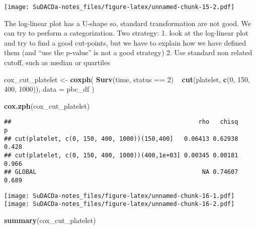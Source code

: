 \documentclass[]{book}
\newenvironment{Shaded}{\begin{snugshade}}{\end{snugshade}}
\newcommand{\KeywordTok}[1]{\textcolor[rgb]{0.13,0.29,0.53}{\textbf{{#1}}}}
\newcommand{\DataTypeTok}[1]{\textcolor[rgb]{0.13,0.29,0.53}{{#1}}}
\newcommand{\DecValTok}[1]{\textcolor[rgb]{0.00,0.00,0.81}{{#1}}}
\newcommand{\StringTok}[1]{\textcolor[rgb]{0.31,0.60,0.02}{{#1}}}
\newcommand{\NormalTok}[1]{{#1}}
\theoremstyle{definition}
\theoremstyle{definition}
\theoremstyle{definition}
\theoremstyle{remark}
\begin{document}
\texttt{[image: SuDACDa-notes\_files/figure-latex/unnamed-chunk-15-2.pdf]}

The log-linear plot has a U-shape so, standard transformation are not
good. We can try to perform a categorization. Two strategy: 1. look at
the log-linear plot and try to find a good cut-points, but we have to
explain how we have defined them (and ``use the p-value'' is not a good
strategy) 2. Use standard non related cutoff, such as median or
quartiles

\begin{Shaded}
\begin{Highlighting}[]
\NormalTok{cox_cut_platelet <-}\StringTok{ }\KeywordTok{coxph}\NormalTok{(}
  \KeywordTok{Surv}\NormalTok{(time, status ==}\StringTok{ }\DecValTok{2}\NormalTok{) ~}\StringTok{ }\KeywordTok{cut}\NormalTok{(platelet, }\KeywordTok{c}\NormalTok{(}\DecValTok{0}\NormalTok{, }\DecValTok{150}\NormalTok{, }\DecValTok{400}\NormalTok{, }\DecValTok{1000}\NormalTok{)),}
  \DataTypeTok{data =} \NormalTok{pbc_df}
\NormalTok{)}

\KeywordTok{cox.zph}\NormalTok{(cox_cut_platelet)}
\end{Highlighting}
\end{Shaded}

\begin{verbatim}
##                                                    rho   chisq     p
## cut(platelet, c(0, 150, 400, 1000))(150,400]   0.06413 0.62938 0.428
## cut(platelet, c(0, 150, 400, 1000))(400,1e+03] 0.00345 0.00181 0.966
## GLOBAL                                              NA 0.74607 0.689
\end{verbatim}

\begin{Shaded}
\end{Shaded}

\texttt{[image: SuDACDa-notes\_files/figure-latex/unnamed-chunk-16-1.pdf]}
\texttt{[image: SuDACDa-notes\_files/figure-latex/unnamed-chunk-16-2.pdf]}

\begin{Shaded}
\begin{Highlighting}[]
\KeywordTok{summary}\NormalTok{(cox_cut_platelet)}
\end{Highlighting}
\end{Shaded}
\end{document}
